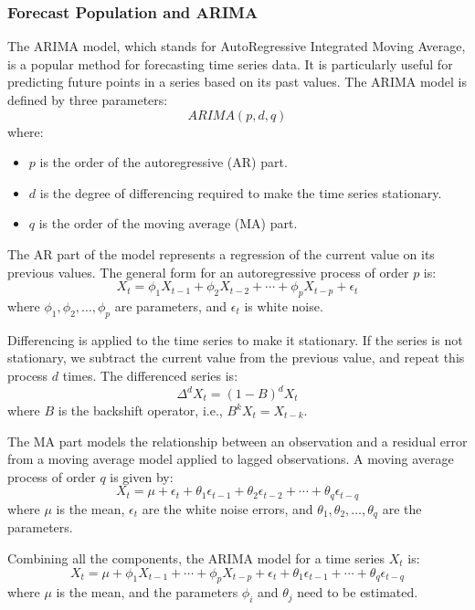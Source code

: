 \documentclass[withoutpreface,bwprint]{cumcmthesis} %
\begin{document}
\subsubsection{Forecast Population and ARIMA}
\begin{definition}
The ARIMA model, which stands for AutoRegressive Integrated Moving Average, is a popular method for forecasting time series data. It is particularly useful for predicting future points in a series based on its past values. The ARIMA model is defined by three parameters:
\[
ARIMA(p, d, q)
\]
where:
\begin{itemize}
    \item \( p \) is the order of the autoregressive (AR) part.
    \item \( d \) is the degree of differencing required to make the time series stationary.
    \item \( q \) is the order of the moving average (MA) part.
\end{itemize}

The AR part of the model represents a regression of the current value on its previous values. The general form for an autoregressive process of order \( p \) is:
\[
X_t = \phi_1 X_{t-1} + \phi_2 X_{t-2} + \cdots + \phi_p X_{t-p} + \epsilon_t
\]
where \( \phi_1, \phi_2, \dots, \phi_p \) are parameters, and \( \epsilon_t \) is white noise.

Differencing is applied to the time series to make it stationary. If the series is not stationary, we subtract the current value from the previous value, and repeat this process \( d \) times. The differenced series is:
\[
\Delta^d X_t = (1 - B)^d X_t
\]
where \( B \) is the backshift operator, i.e., \( B^k X_t = X_{t-k} \).

The MA part models the relationship between an observation and a residual error from a moving average model applied to lagged observations. A moving average process of order \( q \) is given by:
\[
X_t = \mu + \epsilon_t + \theta_1 \epsilon_{t-1} + \theta_2 \epsilon_{t-2} + \cdots + \theta_q \epsilon_{t-q}
\]
where \( \mu \) is the mean, \( \epsilon_t \) are the white noise errors, and \( \theta_1, \theta_2, \dots, \theta_q \) are the parameters.

Combining all the components, the ARIMA model for a time series \( X_t \) is:
\[
X_t = \mu + \phi_1 X_{t-1} + \cdots + \phi_p X_{t-p} + \epsilon_t + \theta_1 \epsilon_{t-1} + \cdots + \theta_q \epsilon_{t-q}
\]
where \( \mu \) is the mean, and the parameters \( \phi_i \) and \( \theta_j \) need to be estimated.
\end{definition}
\end{document}
